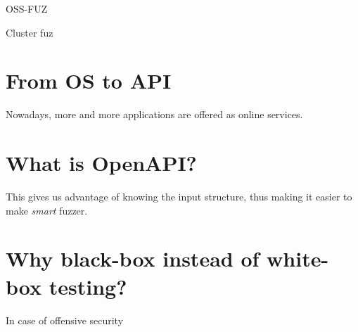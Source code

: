 OSS-FUZ

Cluster fuz

\section{From OS to API}
Nowadays, more and more applications are offered as online services.

\section{What is OpenAPI?}
This gives us advantage of knowing the input structure, thus making it easier to make \emph{smart} fuzzer.

\section{Why black-box instead of white-box testing?}
In case of offensive security
